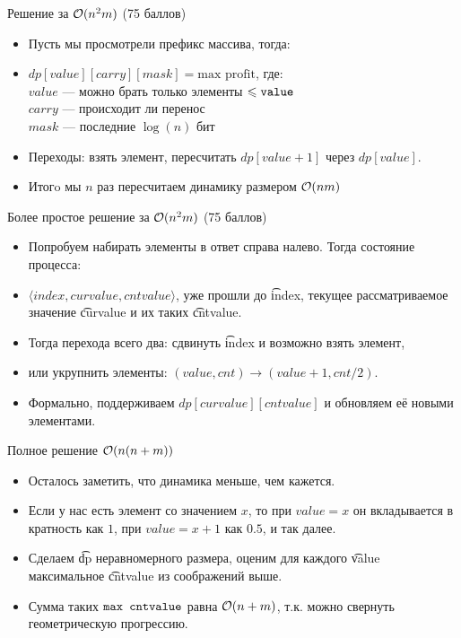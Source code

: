 \begin{frame}{Решение за $\mathcal{O}(n^2m)$ (75 баллов)}
  \begin{itemize}
  \item Пусть мы просмотрели префикс массива, тогда:
  \item $dp[value][carry][mask] = \text{max profit}$, где:\\
  \indent $value$ --- можно брать только элементы $\leqslant \texttt{value}$ \\
  \indent $carry$ --- происходит ли перенос \\
  \indent $mask$ --- последние $\log(n)$ бит \\
  \item Переходы: взять элемент, пересчитать $dp[value + 1]$ через $dp[value]$.
  \item Итогo мы $n$ раз пересчитаем динамику размером $\mathcal{O}(nm)$
  \end{itemize}
\end{frame}

\begin{frame}{Более простое решение за $\mathcal{O}(n^2m)$ (75 баллов)}
  \begin{itemize}
  \item Попробуем набирать элементы в ответ справа налево. Тогда состояние процесса:
  \item $\langle index, curvalue, cntvalue \rangle$, уже прошли до \t{index},
    текущее рассматриваемое значение \t{curvalue} и их таких \t{cntvalue}.
  \item Тогда перехода всего два: сдвинуть \t{index} и возможно взять элемент,
  \item или укрупнить элементы: $(value, cnt) \to (value + 1, cnt / 2)$.
  \item Формально, поддерживаем $dp[curvalue][cntvalue]$ и обновляем её новыми элементами.
  \end{itemize}
\end{frame}

\begin{frame}{Полное решение $\mathcal{O}(n(n + m))$}
  \begin{itemize}
  \item Осталось заметить, что динамика меньше, чем кажется.
  \item Если у нас есть элемент со значением $x$, то при $value=x$ он вкладывается в
    кратность как $1$, при $value = x+1$ как $0.5$, и так далее.
  \item Сделаем \t{dp} неравномерного размера, оценим для каждого \t{value} максимальное \t{cntvalue} из соображений выше.
  \item Сумма таких $\texttt{max cntvalue}$ равна $\mathcal{O}(n + m)$, т.к. можно свернуть геометрическую прогрессию.
  \end{itemize}
\end{frame}
